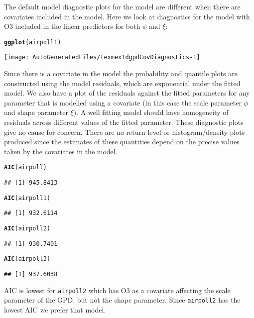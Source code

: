 \documentclass[10pt]{article}\usepackage[]{graphicx}\usepackage[]{color}
\makeatletter
\def\maxwidth{ %
  \ifdim\Gin@nat@width>\linewidth
    \linewidth
  \else
    \Gin@nat@width
  \fi
}
\newcommand{\hlstd}[1]{\textcolor[rgb]{0.345,0.345,0.345}{#1}}%
\newcommand{\hlkwd}[1]{\textcolor[rgb]{0.737,0.353,0.396}{\textbf{#1}}}%
\newenvironment{kframe}{%
 \def\at@end@of@kframe{}%
 \ifinner\ifhmode%
  \def\at@end@of@kframe{\end{minipage}}%
  \begin{minipage}{\columnwidth}%
 \fi\fi%
 \def\FrameCommand##1{\hskip\@totalleftmargin \hskip-\fboxsep
 \colorbox{shadecolor}{##1}\hskip-\fboxsep
     \hskip-\linewidth \hskip-\@totalleftmargin \hskip\columnwidth}%
 \MakeFramed {\advance\hsize-\width
   \@totalleftmargin\z@ \linewidth\hsize
   \@setminipage}}%
 {\par\unskip\endMakeFramed%
 \at@end@of@kframe}
\newenvironment{knitrout}{}{} %
\makeatother
\begin{document}
The default model diagnostic plots for the model are different when there are covariates included in the model.  Here we look at diagnostics for the model with O3 included in the linear predictors for both $\phi$ and $\xi$:
\begin{knitrout}
\color{fgcolor}\begin{kframe}
\begin{alltt}
\hlkwd{ggplot}\hlstd{(airpoll1)}
\end{alltt}
\end{kframe}
\texttt{[image: AutoGeneratedFiles/texmex1dgpdCovDiagnostics-1]} 

\end{knitrout}

Since there is a covariate in the model the probability and quantile plots are constructed using the model residuals, which are exponential under the fitted model. We also have a plot of the residuals against the fitted parameters for any parameter that is modelled using a covariate (in this case the scale parameter $\phi$ and shape parameter $\xi$). A well fitting model should have homogeneity of residuals across different values of the fitted parameter.  These diagnostic plots give no cause for concern.  There are no return level or histogram/density plots produced since the estimates of these quantities depend on the precise values taken by the covariates in the model.


\begin{knitrout}
\color{fgcolor}\begin{kframe}
\begin{alltt}
\hlkwd{AIC}\hlstd{(airpoll)}
\end{alltt}
\begin{verbatim}
## [1] 945.8413
\end{verbatim}
\begin{alltt}
\hlkwd{AIC}\hlstd{(airpoll1)}
\end{alltt}
\begin{verbatim}
## [1] 932.6114
\end{verbatim}
\begin{alltt}
\hlkwd{AIC}\hlstd{(airpoll2)}
\end{alltt}
\begin{verbatim}
## [1] 930.7401
\end{verbatim}
\begin{alltt}
\hlkwd{AIC}\hlstd{(airpoll3)}
\end{alltt}
\begin{verbatim}
## [1] 937.6038
\end{verbatim}
\end{kframe}
\end{knitrout}
AIC is lowest for {\tt airpoll2} which has O3 as a covariate affecting the scale parameter of the GPD, but not the shape parameter.
Since {\tt airpoll2}
has the lowest AIC we prefer that model.
\end{document}
